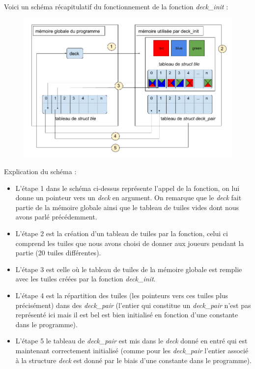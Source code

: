 \documentclass[11pt]{article}
\begin{document}
Voici un schéma récapitulatif du fonctionnement de la fonction \emph{deck\_init} : 

\begin{figure}[h]
\centering
\includegraphics[scale=0.5]{deck_init.png}
\end{figure}

Explication du schéma : 
\begin{itemize}
\item L'étape 1 dans le schéma ci-dessus représente l'appel de la fonction, on lui donne un pointeur vers un \emph{deck} en argument. On remarque que le \emph{deck} fait partie de la mémoire globale ainsi que le tableau de tuiles vides dont nous avons parlé précédemment. 
\item L'étape 2 est la création d'un tableau de tuiles par la fonction, celui ci comprend les tuiles que nous avons choisi de donner aux joueurs pendant la partie (20 tuiles différentes).
\item L'étape 3 est celle où le tableau de tuiles de la mémoire globale est remplie avec les tuiles créées par la fonction \emph{deck\_init}.
\item  L'étape 4 est la répartition des tuiles (les pointeurs vers ces tuiles plus précisément) dans des \emph{deck\_pair} (l'entier qui constitue un \emph{deck\_pair} n'est pas représenté ici mais il est bel est bien initialisé en fonction d'une constante dans le programme).
\item L'étape 5 le tableau de \emph{deck\_pair} est mis dans le \emph{deck} donné en entré qui est maintenant correctement initialisé (comme pour les \emph{deck\_pair} l'entier associé à la structure \emph{deck} est donné par le biais d'une constante dans le programme). \\
\end{itemize}
\end{document}
